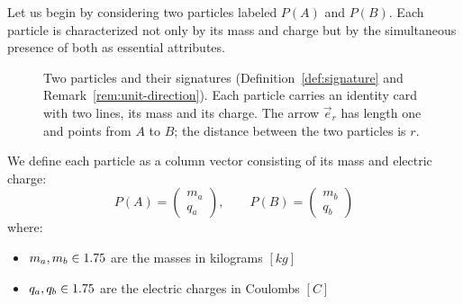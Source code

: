 Let us begin by considering two particles labeled $P(A)$ and $P(B)$. Each particle is characterized not only by its mass and charge but by the simultaneous presence of both as essential attributes.

\begin{figure}[tb]
\myfloatalign
{}
\caption[Two particles and their signatures]{Two particles and their signatures (Definition~\ref{def:signature} and Remark~\ref{rem:unit-direction}). Each particle carries an identity card with two lines, its mass and its charge. The arrow $\vec{e}_r$ has length one and points from $A$ to $B$; the distance between the two particles is $r$.}
\label{fig:signature}
\end{figure}

\begin{definition}\label{def:signature}
We define each particle as a column vector consisting of its mass and electric charge:
\[
P(A) = \begin{pmatrix} m_a \\ q_a \end{pmatrix}, \qquad P(B) = \begin{pmatrix} m_b \\ q_b \end{pmatrix}
\]
where:
\begin{itemize}
  \item $m_a, m_b \in 1.75$ are the masses in kilograms $[kg]$
  \item $q_a, q_b \in 1.75$ are the electric charges in Coulombs $[C]$
\end{itemize}
\end{definition}

